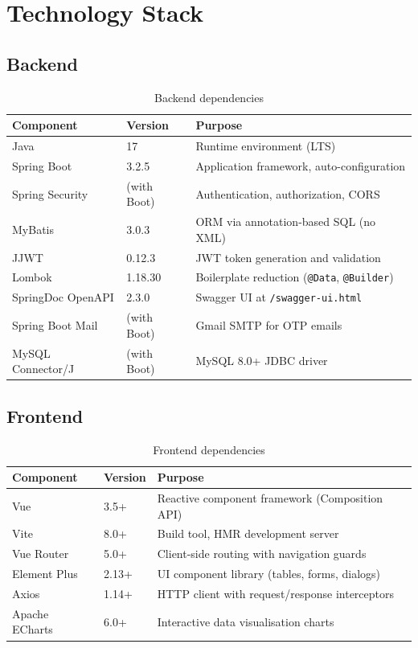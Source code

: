 \documentclass[12pt,letterpaper]{article}
\begin{document}
\section{Technology Stack}

\subsection{Backend}

\begin{table}[H]
\centering
\begin{tabularx}{\linewidth}{l l X}
\toprule
\textbf{Component} & \textbf{Version} & \textbf{Purpose} \\
\midrule
Java & 17 & Runtime environment (LTS) \\
Spring Boot & 3.2.5 & Application framework, auto-configuration \\
Spring Security & (with Boot) & Authentication, authorization, CORS \\
MyBatis & 3.0.3 & ORM via annotation-based SQL (no XML) \\
JJWT & 0.12.3 & JWT token generation and validation \\
Lombok & 1.18.30 & Boilerplate reduction (\texttt{@Data}, \texttt{@Builder}) \\
SpringDoc OpenAPI & 2.3.0 & Swagger UI at \texttt{/swagger-ui.html} \\
Spring Boot Mail & (with Boot) & Gmail SMTP for OTP emails \\
MySQL Connector/J & (with Boot) & MySQL 8.0+ JDBC driver \\
\bottomrule
\end{tabularx}
\caption{Backend dependencies}
\end{table}

\subsection{Frontend}

\begin{table}[H]
\centering
\begin{tabularx}{\linewidth}{l l X}
\toprule
\textbf{Component} & \textbf{Version} & \textbf{Purpose} \\
\midrule
Vue & 3.5+ & Reactive component framework (Composition API) \\
Vite & 8.0+ & Build tool, HMR development server \\
Vue Router & 5.0+ & Client-side routing with navigation guards \\
Element Plus & 2.13+ & UI component library (tables, forms, dialogs) \\
Axios & 1.14+ & HTTP client with request/response interceptors \\
Apache ECharts & 6.0+ & Interactive data visualisation charts \\
\bottomrule
\end{tabularx}
\caption{Frontend dependencies}
\end{table}
\end{document}
